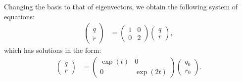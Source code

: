\documentclass[12pt,letterpaper]{article}
\begin{document}
\begin{enumerate}[label=(\alph*)]
	      Changing the basis to that of eigenvectors, we obtain the following system of equations:
	      \begin{align}
		      \begin{pmatrix}
			      \dot{q} \\
			      \dot{r}
		      \end{pmatrix} & =
		      \begin{pmatrix}
			      1 & 0 \\
			      0 & 2
		      \end{pmatrix}
		      \begin{pmatrix}
			      q \\
			      r
		      \end{pmatrix},
	      \end{align}
	      which has solutions in the form:
	      \begin{align}
		      \begin{pmatrix}
			      q \\
			      r
		      \end{pmatrix} & =
		      \begin{pmatrix}
			      \exp(t) & 0        \\
			      0       & \exp(2t)
		      \end{pmatrix}
		      \begin{pmatrix}
			      q_0 \\
			      r_0
		      \end{pmatrix}.
	      \end{align}


\end{enumerate}
\end{document}
